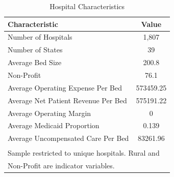 \begin{table}[!h]
\centering
\caption{Hospital Characteristics}
\centering
\begin{tabular}[t]{lc}
\toprule
Characteristic & Value\\
\midrule
Number of Hospitals & 1,807\\
Number of States & 39\\
Average Bed Size & 200.8\\
Non-Profit & 76.1 \\
\addlinespace
Average Operating Expense Per Bed & 573459.25\\
Average Net Patient Revenue Per Bed & 575191.22\\
Average Operating Margin & 0\\
Average Medicaid Proportion & 0.139\\
Average Uncompensated Care Per Bed & 83261.96\\
\bottomrule
\multicolumn{2}{l}{\textsuperscript{} Sample restricted to unique hospitals. Rural and}\\
\multicolumn{2}{l}{Non-Profit are indicator variables.}\\
\end{tabular}
\end{table}
